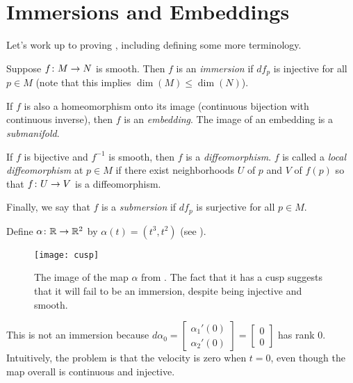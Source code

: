 
\section{Immersions and Embeddings}

Let's work up to proving , including defining some more terminology.

\begin{definition}\label{def:immersion and embedding}
	Suppose $f \colon\thinspace\! M \to N$ is smooth. Then $f$ is an \emph{immersion} if $df_p$ is injective for all $p \in M$ (note that this implies $\dim(M) \leq \dim(N)$). 
	
	If $f$ is also a homeomorphism onto its image (continuous bijection with continuous inverse), then $f$ is an \emph{embedding}. The image of an embedding is a \emph{submanifold}. 
	
	If $f$ is bijective and $f^{-1}$ is smooth, then $f$ is a \emph{diffeomorphism}. $f$ is called a \emph{local diffeomorphism} at $p \in M$ if there exist neighborhoods $U$ of $p$ and $V$ of $f(p)$ so that $f \colon\thinspace\! U \to V$ is a diffeomorphism.
	
	Finally, we say that $f$ is a \emph{submersion} if $df_p$ is surjective for all $p \in M$.
\end{definition}

\begin{example}\label{ex:cusp}
	Define $\alpha \colon\thinspace\! \mathbb{R} \to \mathbb{R}^2$ by $\alpha(t) = (t^3, t^2)$ (see ).
	
	\begin{figure}[htbp]
		\centering
			\texttt{[image: cusp]}
		\caption{The image of the map $\alpha$ from . The fact that it has a cusp suggests that it will fail to be an immersion, despite being injective and smooth.}
		\label{fig:cusp}
	\end{figure}
	
	This is not an immersion because $d\alpha_0 = \begin{bmatrix} \alpha_1'(0) \\ \alpha_2'(0) \end{bmatrix} = \begin{bmatrix} 0 \\ 0 \end{bmatrix}$ has rank 0. Intuitively, the problem is that the velocity is zero when $t=0$, even though the map overall is continuous and injective.
\end{example}

